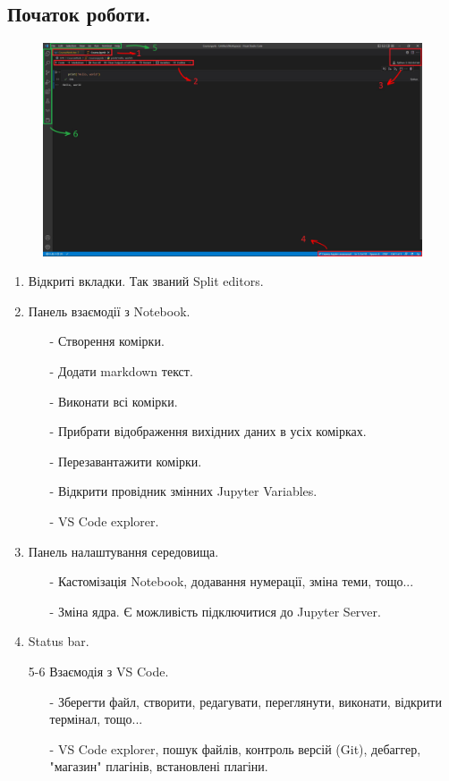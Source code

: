 \documentclass[a4paper,12pt]{article}
\begin{document}
    \subsection {Початок роботи.}
    \hrulefill 
    \begin{figure}[h!]
        \begin{center}
            \includegraphics[scale=0.35]{Prt sc/Figure_6.jpg}
        \end{center}
    \end{figure}
    \begin{enumerate}
        \item Відкриті вкладки. Так званий Split editors.
        \item Панель взаємодії з Notebook.
        \begin{enumerate}
            \item[-] Створення комірки.
            \item[-] Додати markdown текст.
            \item[-] Виконати всі комірки.
            \item[-] Прибрати відображення вихідних даних в усіх комірках.
            \item[-] Перезавантажити комірки. 
            \item[-] Відкрити провідник змінних Jupyter Variables.
            \item[-] VS Code explorer.
        \end{enumerate}
        \item Панель налаштування середовища.
        \begin{enumerate}
            \item[-] Кастомізація Notebook, додавання нумерації, зміна теми, тощо...
            \item[-] Зміна ядра. Є можливість підключитися до Jupyter Server.
        \end{enumerate}
        \item Status bar.
        \item[5-6] Взаємодія з VS Code.
        \begin{enumerate}
            \item[-] Зберегти файл, створити, редагувати, переглянути, виконати, відкрити термінал, тощо...
            \item[-] VS Code explorer, пошук файлів, контроль версій (Git), дебаггер, "магазин" плагінів, встановлені плагіни.
        \end{enumerate}
    \end{enumerate}
\newpage
\end{document}
